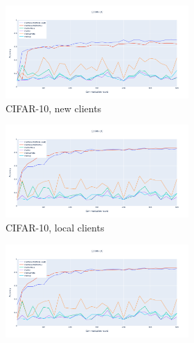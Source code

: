 \documentclass[oneside,a4paper,14pt]{extreport}
\begin{document}
\begin{figure}
    \centering
    \begin{subfigure}{1.\textwidth}
        \centering
        \begin{subfigure}{.25\textwidth}
            \centering
            \includegraphics[width=\linewidth]{./tab_img/cifar_per_new.png}
            \caption{CIFAR-10, new clients}
            \label{fig:cifar_per_new}
        \end{subfigure}%
        \begin{subfigure}{.25\textwidth}
            \centering
            \includegraphics[width=\linewidth]{./tab_img/cifar_per_old.png}
            \caption{CIFAR-10, local clients}
            \label{fig:cifar_per_old}
        \end{subfigure}
        \begin{subfigure}{.25\textwidth}
            \centering
            \includegraphics[width=\linewidth]{./tab_img/cifar_per_old.png}

\end{subfigure}
\end{subfigure}
\end{figure}
\end{document}
